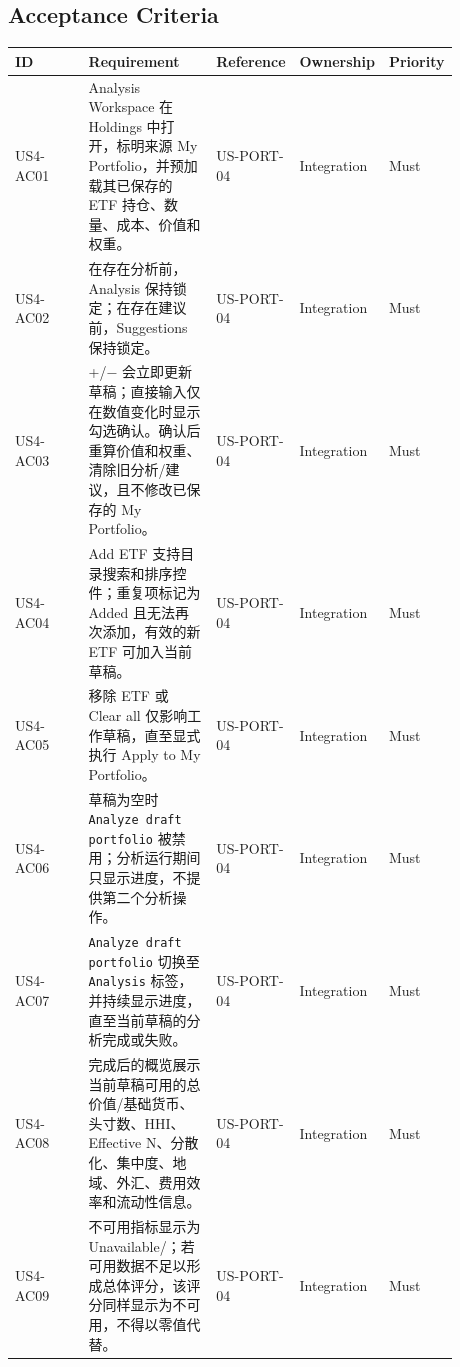 \subsection{Acceptance Criteria}
\begingroup
\small
\begin{longtable}{L{0.18\linewidth}L{0.30\linewidth}L{0.18\linewidth}L{0.12\linewidth}L{0.10\linewidth}}
\toprule
\textbf{ID} & \textbf{Requirement} & \textbf{Reference} & \textbf{Ownership} & \textbf{Priority} \\
\midrule
US4-AC01 & Analysis Workspace 在 Holdings 中打开，标明来源 My Portfolio，并预加载其已保存的 ETF 持仓、数量、成本、价值和权重。 & US-PORT-04 & Integration & Must \\
US4-AC02 & 在存在分析前，Analysis 保持锁定；在存在建议前，Suggestions 保持锁定。 & US-PORT-04 & Integration & Must \\
US4-AC03 & +/\allowbreak{}\ensuremath{-} 会立即更新草稿；直接输入仅在数值变化时显示勾选确认。确认后重算价值和权重、清除旧分析/\allowbreak{}建议，且不修改已保存的 My Portfolio。 & US-PORT-04 & Integration & Must \\
US4-AC04 & Add ETF 支持目录搜索和排序控件；重复项标记为 Added 且无法再次添加，有效的新 ETF 可加入当前草稿。 & US-PORT-04 & Integration & Must \\
US4-AC05 & 移除 ETF 或 Clear all 仅影响工作草稿，直至显式执行 Apply to My Portfolio。 & US-PORT-04 & Integration & Must \\
US4-AC06 & 草稿为空时 \texttt{Analyze draft portfolio} 被禁用；分析运行期间只显示进度，不提供第二个分析操作。 & US-PORT-04 & Integration & Must \\
US4-AC07 & \texttt{Analyze draft portfolio} 切换至 \texttt{Analysis} 标签，并持续显示进度，直至当前草稿的分析完成或失败。 & US-PORT-04 & Integration & Must \\
US4-AC08 & 完成后的概览展示当前草稿可用的总价值/\allowbreak{}基础货币、头寸数、HHI、Effective N、分散化、集中度、地域、外汇、费用效率和流动性信息。 & US-PORT-04 & Integration & Must \\
US4-AC09 & 不可用指标显示为 Unavailable/\allowbreak{}\textemdash{}；若可用数据不足以形成总体评分，该评分同样显示为不可用，不得以零值代替。 & US-PORT-04 & Integration & Must \\

\end{longtable}
